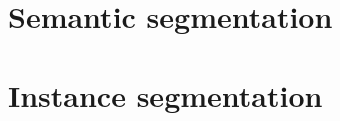 
\section{Semantic segmentation}
\label{semantic-segmentation}


\section{Instance segmentation}
\label{instance-segmentation}


